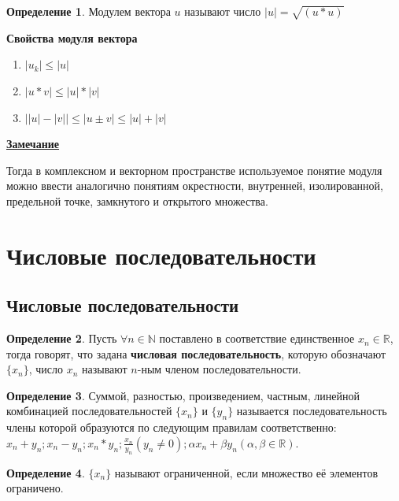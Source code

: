 \documentclass[a4paper,oneside]{article}
\newcommand{\parspace}{\vspace{10pt}}
\theoremstyle{definition}
\newtheorem{definition}{Определение}[subsection]
\theoremstyle{definition}
\theoremstyle{definition}
\begin{document}
\begin{definition}
    Модулем вектора $u$ называют число $|u| = \sqrt{(u * u)}$
\end{definition}

\textbf{Свойства модуля вектора}
\begin{enumerate}
    \item $|u_k| \le |u|$
    \item $|u * v| \le |u| * |v|$
    \item $\big||u| - |v|\big| \le |u \pm v| \le |u| + |v|$
\end{enumerate}

\parspace

\underline{\textbf{Замечание}}

Тогда в комплексном и векторном пространстве используемое понятие модуля
можно ввести аналогично понятиям окрестности, внутренней, изолированной,
предельной точке, замкнутого и открытого множества.

\section{Числовые последовательности}

\subsection{Числовые последовательности}

\begin{definition}
    Пусть $\forall n \in \mathbb{N}$ поставлено в соответствие единственное $x_n \in \mathbb{R}$,
    тогда говорят, что задана \textbf{числовая последовательность}, которую обозначают
    $\{x_n\}$, число $x_n$ называют $n$-ным членом последовательности.
\end{definition}

\begin{definition}
    Суммой, разностью, произведением, частным, линейной комбинацией последовательностей 
    $\{x_n\}$ и $\{y_n\}$ называется последовательность члены которой образуются 
    по следующим правилам соответственно: 
    $x_n + y_n; x_n - y_n; x_n * y_n; \frac{x_n}{y_n} (y_n \ne 0); \alpha x_n + \beta y_n (\alpha, \beta \in \mathbb{R})$.
\end{definition}

\begin{definition}
    $\{x_n\}$ называют ограниченной, если множество её элементов ограничено.
\end{definition}
\end{document}

